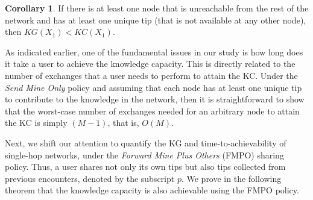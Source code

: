 \documentclass[conference]{IEEEtran}
\newtheorem{theorem}{Theorem}
\theoremstyle{definition}
\newtheorem*{cor}{Corollary}
\begin{document}
\vspace{-0.4 cm}
\begin{cor}
If there is at least one node that is unreachable from the rest of the network and has at least one unique tip (that is not available at any other node), then $KG(X_1) < KC(X_1)$.
\end{cor}
\vspace{-0.2 cm}
%
%
As indicated earlier, one of the fundamental issues in our study is how long does it take a user to achieve the knowledge capacity. This is directly related to the number 
of exchanges that a user needs to perform to attain the KC. Under the {\it Send Mine Only} policy and assuming that each node has at least one unique tip to contribute to the knowledge in the network, then it is straightforward to show that the worst-case number of exchanges needed for an arbitrary node to attain the KC is simply $(M-1)$, that is, $O(M)$.

Next, we shift our attention to quantify the KG and time-to-achievability of single-hop networks, under the {\it Forward Mine Plus Others} (FMPO) sharing policy. Thus, a user shares not only its own tips but also tips collected from previous encounters, denoted by the subscript $p$. We prove in the following theorem that the knowledge capacity is also achievable using the FMPO policy.
\end{document}
